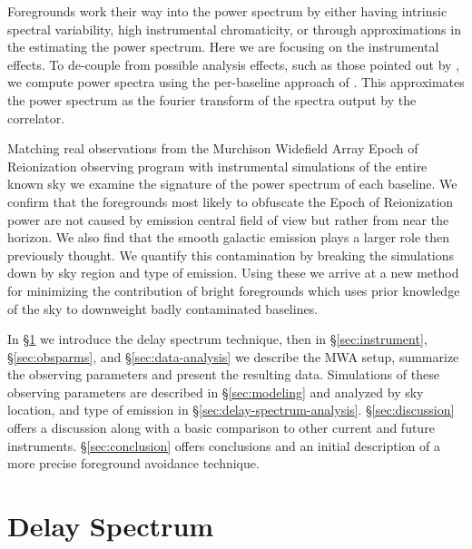 \documentclass[preprint2,iop,numberedappendix]{emulateapj}
\begin{document}
Foregrounds work their way into the power spectrum by either having intrinsic spectral variability, high instrumental chromaticity, or through approximations in the estimating the power spectrum. Here we are focusing on the instrumental effects. To de-couple from possible analysis effects, such as those pointed out by \citet{Haz13}, we compute power spectra using the per-baseline approach of \citet{pob13,arp14}.  This approximates the power spectrum as the fourier transform of the spectra output by the correlator. 



 Matching real observations from the Murchison Widefield Array Epoch of Reionization observing program with instrumental simulations of the entire known sky we examine the signature of the power spectrum of each baseline.  We confirm that the foregrounds most likely to obfuscate the Epoch of Reionization power are not caused by emission central field of view but rather from near the horizon. We also find that the smooth galactic emission plays a larger role then previously thought. We quantify this contamination by breaking the simulations down by sky region and type of emission. Using these we arrive at a new method for minimizing the contribution of bright foregrounds which uses prior knowledge of the sky to downweight badly contaminated baselines.

In \S\ref{sec:delay-spectrum} we introduce the delay spectrum technique, then in  \S\ref{sec:instrument}, \S\ref{sec:obsparms}, and \S\ref{sec:data-analysis} we describe the MWA setup, summarize the observing parameters and present the resulting data.  Simulations of these observing parameters are described in \S\ref{sec:modeling} and analyzed by sky location, and type of emission in \S\ref{sec:delay-spectrum-analysis}.  \S\ref{sec:discussion} offers a discussion along with a basic comparison to other current and future instruments. \S\ref{sec:conclusion} offers conclusions and an initial description of a more precise foreground avoidance technique.


\section{Delay Spectrum}\label{sec:delay-spectrum}
\end{document}
